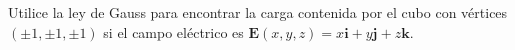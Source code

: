 \item Utilice la ley de Gauss para encontrar la carga contenida por el cubo con vértices $(\pm 1, \pm 1, \pm 1)$ si el campo eléctrico es $\mathbf{E}(x, y, z) = x\mathbf{i} + y\mathbf{j} + z\mathbf{k}$.
